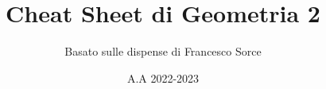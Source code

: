 \documentclass[10pt]{report}
\title{\Huge{Cheat Sheet di Geometria 2}}
\date{A.A 2022-2023}
\author{Basato sulle dispense di Francesco Sorce}
\begin{document}
\maketitle

\begin{multicols*}{2}
    \tableofcontents
\end{multicols*}

\newpage




\end{document}
